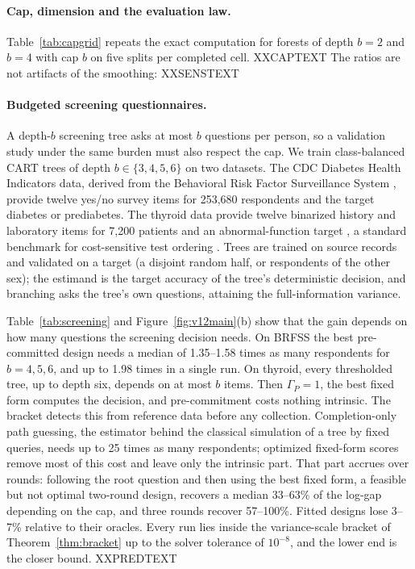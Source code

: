 \paragraph{Cap, dimension and the evaluation law.}
Table~\ref{tab:capgrid} repeats the exact computation for forests of depth $b=2$ and $b=4$ with cap $b$ on five splits per completed cell. XXCAPTEXT The ratios are not artifacts of the smoothing: XXSENSTEXT



\paragraph{Budgeted screening questionnaires.}
A depth-$b$ screening tree asks at most $b$ questions per person, so a validation study under the same burden must also respect the cap. We train class-balanced CART trees of depth $b\in\{3,4,5,6\}$ on two datasets. The CDC Diabetes Health Indicators data, derived from the Behavioral Risk Factor Surveillance System \citep{cdcdiabetes2017}, provide twelve yes/no survey items for 253,680 respondents and the target diabetes or prediabetes. The thyroid data provide twelve binarized history and laboratory items for 7,200 patients and an abnormal-function target \citep{quinlan1986thyroid}, a standard benchmark for cost-sensitive test ordering \citep{turney1995}. Trees are trained on source records and validated on a target (a disjoint random half, or respondents of the other sex); the estimand is the target accuracy of the tree's deterministic decision, and branching asks the tree's own questions, attaining the full-information variance.



Table~\ref{tab:screening} and Figure~\ref{fig:v12main}(b) show that the gain depends on how many questions the screening decision needs. On BRFSS the best pre-committed design needs a median of 1.35--1.58 times as many respondents for $b=4,5,6$, and up to 1.98 times in a single run. On thyroid, every thresholded tree, up to depth six, depends on at most $b$ items. Then $\Gamma_P=1$, the best fixed form computes the decision, and pre-commitment costs nothing intrinsic. The bracket detects this from reference data before any collection. Completion-only path guessing, the estimator behind the classical simulation of a tree by fixed queries, needs up to 25 times as many respondents; optimized fixed-form scores remove most of this cost and leave only the intrinsic part. That part accrues over rounds: following the root question and then using the best fixed form, a feasible but not optimal two-round design, recovers a median 33--63\% of the log-gap depending on the cap, and three rounds recover 57--100\%. Fitted designs lose 3--7\% relative to their oracles. Every run lies inside the variance-scale bracket of Theorem~\ref{thm:bracket} up to the solver tolerance of $10^{-8}$, and the lower end is the closer bound. XXPREDTEXT

